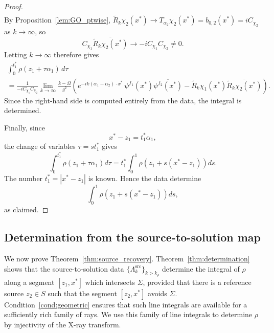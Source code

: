 \documentclass[12pt,a4paper]{amsart}
\numberwithin{equation}{section}
\theoremstyle{plain}
\theoremstyle{definition}
\begin{document}
\begin{proof}
\begin{multline*}
\end{multline*}
By Proposition~\ref{lem:GO_ptwise},
$\widetilde{R}_k\chi_2(x^*)\to T_{\alpha_2}\chi_2(x^*)=b_{0,2}(x^*)=iC_{\chi_2}$ as
$k\to\infty$, so
\begin{equation*}
    C_{\chi_1}\overline{\widetilde{R}_k\chi_2(x^*)}
    \to -iC_{\chi_1}C_{\chi_2}\neq 0.
\end{equation*}
Letting $k\to\infty$ therefore gives
\begin{multline*}
    \int_0^{t_1^*}\rho(z_1+\tau\alpha_1)\,d\tau
    \\
    = \frac{1}{-iC_{\chi_1}C_{\chi_2}}
      \lim_{k\to\infty}
      \frac{k-\Omega}{g^2}
    \left(
    e^{-ik(\alpha_1-\alpha_2)\cdot x^*}\,
    \psi^{f_1}(x^*)\overline{\psi^{f_2}(x^*)}
    - \widetilde{R}_k\chi_1(x^*)\overline{\widetilde{R}_k\chi_2(x^*)}
    \right).
\end{multline*}
Since the right-hand side is computed entirely from the data, the integral is
determined.

Finally, since
\begin{equation*}
    x^*-z_1=t_1^*\alpha_1,
\end{equation*}
the change of variables $\tau=s t_1^*$ gives
\begin{equation*}
    \int_0^{t_1^*}\rho(z_1+\tau\alpha_1)d\tau
    =
    t_1^*
    \int_0^1
    \rho(z_1+s(x^*-z_1))ds.
\end{equation*}
The number $t_1^*=|x^*-z_1|$ is known. Hence the data determine
\begin{equation*}
    \int_0^1
    \rho(z_1+s(x^*-z_1))ds,
\end{equation*}
as claimed.
\end{proof}

\subsection{Determination from the source-to-solution map}
We now prove Theorem~\ref{thm:source_recovery}. 
Theorem~\ref{thm:determination} shows that the source-to-solution data $\{\Lambda_k^{\mathrm{src}}\}_{k>k_\rho}$ determine the integral of $\rho$ along a segment $[z_1,x^*]$ which
intersects $\Sigma$, provided that there is a reference source $z_2\in S$
such that the segment $[z_2,x^*]$ avoids $\Sigma$. 
Condition~\ref{cond:geometric} ensures that such line integrals are available for a sufficiently rich family of rays. We use this family of line integrals to determine $\rho$ by injectivity of the X-ray transform.
\end{document}
